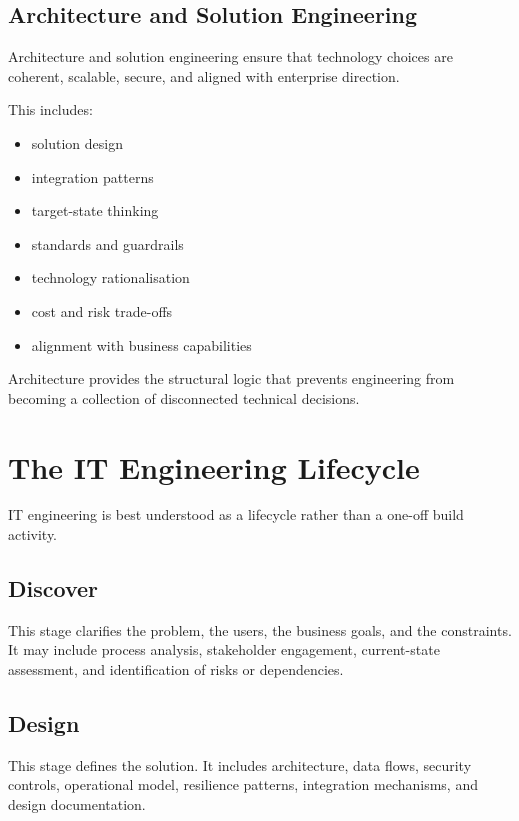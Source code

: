 \documentclass[
  british,
  letterpaper,
  DIV=11,
  numbers=noendperiod]{scrartcl}
\providecommand{\tightlist}{%
  \setlength{\itemsep}{0pt}\setlength{\parskip}{0pt}}
\begin{document}
\subsection{Architecture and Solution
Engineering}\label{architecture-and-solution-engineering}

Architecture and solution engineering ensure that technology choices are
coherent, scalable, secure, and aligned with enterprise direction.

This includes:

\begin{itemize}
\tightlist
\item
  solution design
\item
  integration patterns
\item
  target-state thinking
\item
  standards and guardrails
\item
  technology rationalisation
\item
  cost and risk trade-offs
\item
  alignment with business capabilities
\end{itemize}

Architecture provides the structural logic that prevents engineering
from becoming a collection of disconnected technical decisions.

\section{The IT Engineering
Lifecycle}\label{the-it-engineering-lifecycle}

IT engineering is best understood as a lifecycle rather than a one-off
build activity.

\subsection{Discover}\label{discover}

This stage clarifies the problem, the users, the business goals, and the
constraints. It may include process analysis, stakeholder engagement,
current-state assessment, and identification of risks or dependencies.

\subsection{Design}\label{design}

This stage defines the solution. It includes architecture, data flows,
security controls, operational model, resilience patterns, integration
mechanisms, and design documentation.
\end{document}
